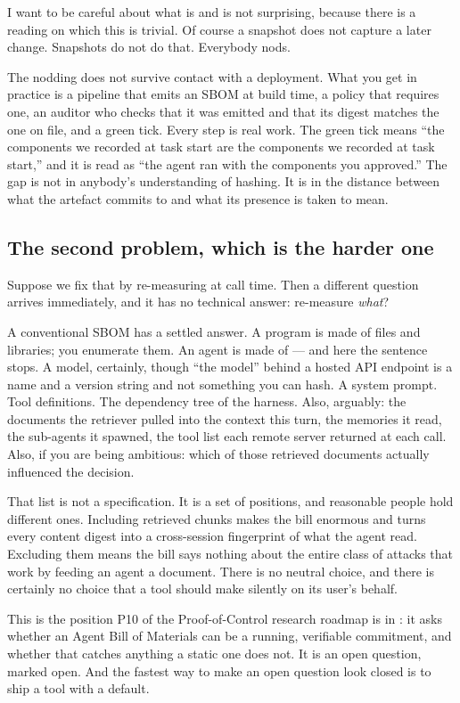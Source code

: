 \documentclass[11pt]{article}
\begin{document}
I want to be careful about what is and is not surprising, because there is a
reading on which this is trivial. Of course a snapshot does not capture a
later change. Snapshots do not do that. Everybody nods.

The nodding does not survive contact with a deployment. What you get in
practice is a pipeline that emits an SBOM at build time, a policy that
requires one, an auditor who checks that it was emitted and that its digest
matches the one on file, and a green tick. Every step is real work. The green
tick means ``the components we recorded at task start are the components we
recorded at task start,'' and it is read as ``the agent ran with the
components you approved.'' The gap is not in anybody's understanding of
hashing. It is in the distance between what the artefact commits to and what
its presence is taken to mean.

\subsection{The second problem, which is the harder one}

Suppose we fix that by re-measuring at call time. Then a different question
arrives immediately, and it has no technical answer: re-measure \emph{what}?

A conventional SBOM has a settled answer. A program is made of files and
libraries; you enumerate them. An agent is made of --- and here the sentence
stops. A model, certainly, though ``the model'' behind a hosted API endpoint
is a name and a version string and not something you can hash. A system
prompt. Tool definitions. The dependency tree of the harness. Also, arguably:
the documents the retriever pulled into the context this turn, the memories it
read, the sub-agents it spawned, the tool list each remote server returned at
each call. Also, if you are being ambitious: which of those retrieved
documents actually influenced the decision.

That list is not a specification. It is a set of positions, and reasonable
people hold different ones. Including retrieved chunks makes the bill enormous
and turns every content digest into a cross-session fingerprint of what the
agent read. Excluding them means the bill says nothing about the entire class
of attacks that work by feeding an agent a document. There is no neutral
choice, and there is certainly no choice that a tool should make silently on
its user's behalf.

This is the position P10 of the Proof-of-Control research roadmap is in
\cite{p10}: it asks whether an Agent Bill of Materials can be a running,
verifiable commitment, and whether that catches anything a static one does
not. It is an open question, marked open. And the fastest way to make an open
question look closed is to ship a tool with a default.
\end{document}
